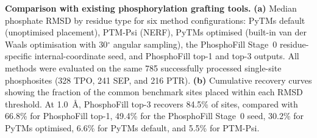 \caption{\textbf{Comparison with existing phosphorylation grafting tools.} \textbf{(a)} Median phosphate RMSD by residue type for six method configurations: PyTMs default (unoptimised placement), PTM-Psi (NERF), PyTMs optimised (built-in van der Waals optimisation with 30$^{\circ}$ angular sampling), the PhosphoFill Stage~0 residue-specific internal-coordinate seed, and PhosphoFill top-1 and top-3 outputs. All methods were evaluated on the same 785 successfully processed single-site phosphosites (328 TPO, 241 SEP, and 216 PTR). \textbf{(b)} Cumulative recovery curves showing the fraction of the common benchmark sites placed within each RMSD threshold. At 1.0~\AA, PhosphoFill top-3 recovers 84.5\% of sites, compared with 66.8\% for PhosphoFill top-1, 49.4\% for the PhosphoFill Stage~0 seed, 30.2\% for PyTMs optimised, 6.6\% for PyTMs default, and 5.5\% for PTM-Psi.}
